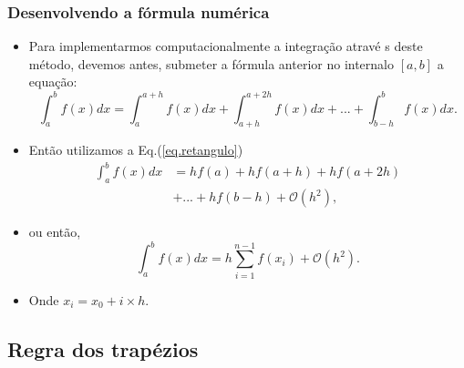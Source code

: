 \documentclass[xcolor=table]{beamer}
\newenvironment{stepitemize}{\begin{itemize}[<+->]}{\end{itemize} }
\begin{document}
\begin{frame}%

\frametitle{Desenvolvendo a f\'{o}rmula num\'{e}rica}

\begin{stepitemize}
\item Para implementarmos computacionalmente a integra\c{c}\~{a}o atrav\'{e}%
s deste m\'{e}todo, devemos antes, submeter a f\'{o}rmula anterior no
internalo $[a,b]$ a equa\c{c}\~{a}o:%
\[
\int_{a}^{b}f\left( x\right) dx=\int_{a}^{a+h}f\left( x\right)
dx+\int_{a+h}^{a+2h}f\left( x\right) dx+...+\int_{b-h}^{b}f\left( x\right)
dx.
\]

\item Ent\~{a}o utilizamos a Eq.(\ref{eq.retangulo})%
\begin{eqnarray*}
	\int_{a}^{b}f\left( x\right) dx&=hf\left( a\right) +hf\left( a+h\right)
	+hf\left( a+2h\right) \\
	&+...+hf\left( b-h\right) + \mathcal{O}\left( h^{2}\right) ,
\end{eqnarray*}
 

\item ou ent\~{a}o,%
\[
\int_{a}^{b}f\left( x\right) dx=h\sum_{i=1}^{n-1}f\left( x_{i}\right) + \mathcal{O}\left( h^{2}\right) . 
\]

\item Onde $x_{i}=x_{0}+i\times h$.
\end{stepitemize}

\transboxout%
\end{frame}%

\subsection{Regra dos trap\'{e}zios}
\end{document}
